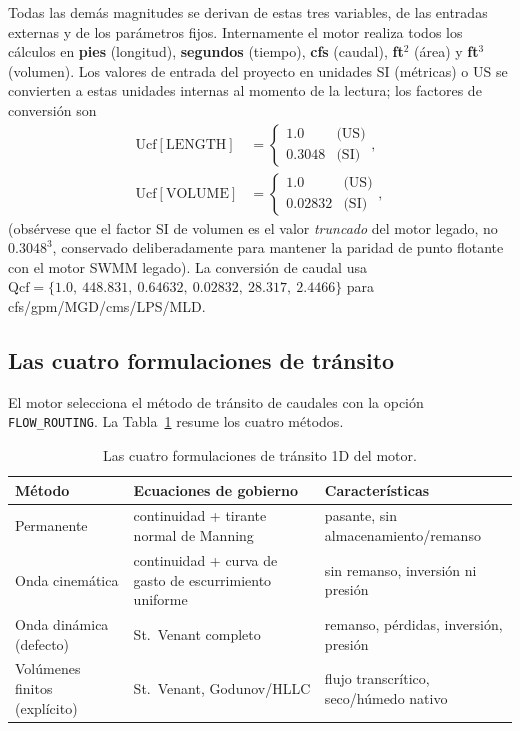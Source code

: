 \documentclass[11pt,a4paper]{article}
\begin{document}
Todas las demás magnitudes se derivan de estas tres variables, de las entradas
externas y de los parámetros fijos. Internamente el motor realiza todos los
cálculos en \textbf{pies} (longitud), \textbf{segundos} (tiempo), \textbf{cfs}
(caudal), \textbf{ft$^2$} (área) y \textbf{ft$^3$} (volumen). Los valores de
entrada del proyecto en unidades SI (métricas) o US se convierten a estas
unidades internas al momento de la lectura; los factores de conversión son
\begin{align}
  \mathrm{Ucf}[\mathrm{LENGTH}] &=
    \begin{cases} 1.0 & \text{(US)} \\ 0.3048 & \text{(SI)} \end{cases}, \\
  \mathrm{Ucf}[\mathrm{VOLUME}] &=
    \begin{cases} 1.0 & \text{(US)} \\ 0.02832 & \text{(SI)} \end{cases},
\end{align}
(obsérvese que el factor SI de volumen es el valor \emph{truncado} del motor
legado, no $0.3048^3$, conservado deliberadamente para mantener la paridad de
punto flotante con el motor SWMM legado). La conversión de caudal usa
$\mathrm{Qcf} = \{1.0,\ 448.831,\ 0.64632,\ 0.02832,\ 28.317,\ 2.4466\}$ para
cfs/gpm/MGD/cms/LPS/MLD.

\subsection{Las cuatro formulaciones de tránsito}

El motor selecciona el método de tránsito de caudales con la opción
\texttt{FLOW\_ROUTING}. La Tabla~\ref{tab:routing} resume los cuatro métodos.

\begin{table}[H]
\centering
\begin{tabular}{@{}l p{4.6cm} p{5.4cm}@{}}
\toprule
\textbf{Método} & \textbf{Ecuaciones de gobierno} & \textbf{Características} \\
\midrule
Permanente & continuidad + tirante normal de Manning & pasante, sin almacenamiento/remanso \\
Onda cinemática & continuidad + curva de gasto de escurrimiento uniforme & sin remanso, inversión ni presión \\
Onda dinámica (defecto) & St.\ Venant completo & remanso, pérdidas, inversión, presión \\
Volúmenes finitos (explícito) & St.\ Venant, Godunov/HLLC & flujo transcrítico, seco/húmedo nativo \\
\bottomrule
\end{tabular}
\caption{Las cuatro formulaciones de tránsito 1D del motor.}
\label{tab:routing}
\end{table}
\end{document}
